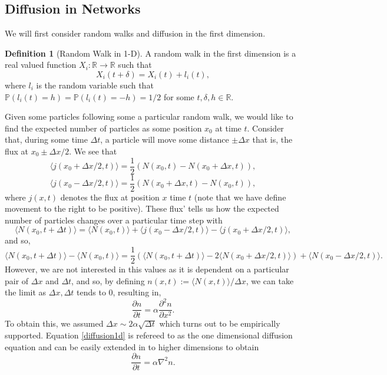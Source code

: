 \documentclass[
]{article}
\theoremstyle{definition}
\theoremstyle{definition}
\newtheorem{definition}{Definition}[section]
\begin{document}
\hypertarget{diffusion-in-networks}{%
\subsection{Diffusion in Networks}\label{diffusion-in-networks}}

We will first consider random walks and diffusion in the first
dimension.

\begin{definition}[Random Walk in 1-D]
  A random walk in the first dimension is a real valued function 
  \(X_i : \mathbb{R} \to \mathbb{R}\) such that 
  \[X_i(t + \delta) = X_i(t) + l_i(t),\]
  where \(l_i\) is the random variable such that 
  \(\mathbb{P}(l_i(t) = h) = \mathbb{P}(l_i(t) = -h) = 1 / 2\) for 
  some \(t, \delta, h \in \mathbb{R}\).
\end{definition}

Given some particles following some a particular random walk, we would
like to find the expected number of particles as some position \(x_0\)
at time \(t\). Consider that, during some time \(\Delta t\), a particle
will move some distance \(\pm \Delta x\) that is, the flux at
\(x_0 \pm \Delta x/ 2\). We see that
\[\langle j(x_0 + \Delta x / 2, t) \rangle = \frac{1}{2}(N(x_0, t) - N(x_0 + \Delta x, t)),\]
\[\langle j(x_0 - \Delta x / 2, t) \rangle = \frac{1}{2}(N(x_0 + \Delta x, t) - N(x_0, t)),\]
where \(j(x, t)\) denotes the flux at position \(x\) time \(t\) (note
that we have define movement to the right to be positive). These flux'
tells us how the expected number of particles changes over a particular
time step with
\[\langle N(x_0, t + \Delta t) \rangle = \langle N(x_0, t) \rangle + 
  \langle j(x_0 - \Delta x / 2, t) \rangle -
  \langle j(x_0 + \Delta x / 2, t) \rangle,\] and so,
\[\langle N(x_0, t + \Delta t) \rangle - \langle N(x_0, t) \rangle = 
  \frac{1}{2}(\langle N(x_0, t + \Delta t) \rangle - 
   2\langle N(x_0 + \Delta x / 2, t) \rangle) +
  \langle N(x_0 - \Delta x / 2, t) \rangle.\] However, we are not
interested in this values as it is dependent on a particular pair of
\(\Delta x\) and \(\Delta t\), and so, by defining
\(n(x, t) := \langle N(x, t) \rangle / \Delta x\), we can take the limit
as \(\Delta x, \Delta t\) tends to 0, resulting in,
\begin{equation}\label{diffusion1d}
\frac{\partial{n}}{\partial{t}} = \alpha \frac{\partial^2{n}}{\partial{x}^2}.  
\end{equation} To obtain this, we assumed
\(\Delta x \sim 2\alpha \sqrt{\Delta t}\) which turns out to be
empirically supported. Equation \ref{diffusion1d} is refereed to as the
one dimensional diffusion equation and can be easily extended in to
higher dimensions to obtain \begin{equation}
  \frac{\partial{n}}{\partial{t}} = \alpha \nabla ^2 n.
\end{equation}
\end{document}
